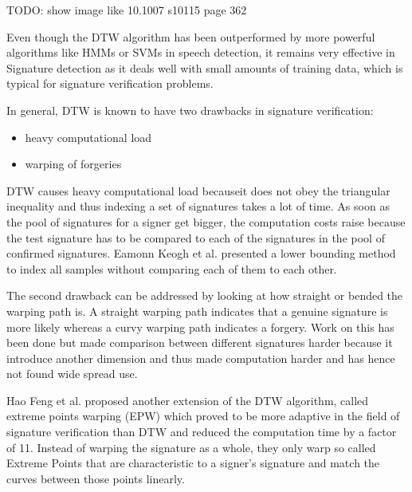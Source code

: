 \documentclass[a4paper, oneside]{csthesis}
\begin{document}
TODO: show image like 10.1007 s10115 page 362

Even though the DTW algorithm has been outperformed by more powerful algorithms like HMMs or SVMs in speech detection, it remains very effective in Signature detection as it deals well with small amounts of training data, which is typical for signature verification problems.

In general, DTW is known to have two drawbacks in signature verification:
\begin{itemize}
\item heavy computational load
\item warping of forgeries
\end{itemize}

DTW causes heavy computational load becauseit does not obey the triangular inequality and thus indexing a set of signatures takes a lot of time. As soon as the pool of signatures for a signer get bigger, the computation costs raise because the test signature has to be compared to each of the signatures in the pool of confirmed signatures. Eamonn Keogh et al. presented a lower bounding method to index all samples without comparing each of them to each other. \cite{Keogh:2002:EID:1287369.1287405}

The second drawback can be addressed by looking at how straight or bended the warping path is. A straight warping path indicates that a genuine signature is more likely whereas a curvy warping path indicates a forgery. Work on this has been done \cite{Sato1982} but made comparison between different signatures harder because it introduce another dimension and thus made computation harder and has hence not found wide spread use.

Hao Feng et al. proposed another extension of the DTW algorithm, called extreme points warping (EPW) which proved to be more adaptive in the field of signature verification than DTW and reduced the computation time by a factor of 11. \cite{Feng:2003:OSV:961320.961331} Instead of warping the signature as a whole, they only warp so called Extreme Points that are characteristic to a signer's signature and match the curves between those points linearly.



\end{document}
